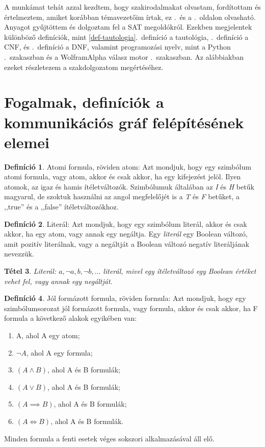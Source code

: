 \documentclass[
]{thesis-ekf}
\newtheorem{tetel}{Tétel}[chapter]
\theoremstyle{definition}
\newtheorem{definicio}[tetel]{Definíció}
\theoremstyle{remark}
\begin{document}
	A munkámat tehát azzal kezdtem, hogy szakirodalmakat olvastam, fordítottam és értelmeztem, amiket korábban témavezetőim írtak, ez \az{\pageref{ssec-szakirodalom}}.~és a \az{\pageref{sec-szakirodalom-forditas}}.~oldalon olvasható.
	Anyagot gyűjtöttem és dolgoztam fel a \textsc{SAT} megoldókról.
	Ezekben megjelentek különböző definíciók, mint \ref{def-tautologia}.~definíció a tautológia, \az{\ref{def-cnf}}.~definíció a \textsc{CNF}, és \az{\ref{def-dnf}}.~definíció a \textsc{DNF}, valamint programozási nyelv, mint a Python \az{\ref{kif-python-programnyelv}}.~szakaszban és a WolframAlpha válasz motor \az{\ref{kif-wolframalpha-hasznalata}}.~szakaszban. Az alábbiakban ezeket részletezem a szakdolgozatom megértéséhez.
		
	\section{Fogalmak, definíciók a kommunikációs gráf felépítésének elemei}\label{sec-alap-fogalmak}
	
	\begin{definicio}
		Atomi formula, röviden atom: Azt mondjuk, hogy egy szimbólum atomi formula, vagy atom, akkor és csak akkor, ha egy kifejezést jelöl. Ilyen atomok, az igaz és hamis ítéletváltozók. Szimbólumuk általában az \emph{I} és \emph{H} betűk magyarul, de szoktuk használni az angol megfelelőjét is a \emph{T} és \emph{F} betűket, a ,,true'' és a ,,false'' ítéletváltozókhoz.
	\end{definicio}

	\begin{definicio}
		Literál: Azt mondjuk, hogy egy szimbólum literál, akkor és csak akkor, ha egy atom, vagy annak egy negáltja.
		Egy \emph{literál} egy Boolean változó, amit pozitív literálnak, vagy a negáltját a Boolean változó negatív literáljának nevezzük. 
	\end{definicio}

	\begin{tetel}
		Literál: $ a,\neg a,b,\neg b,\dots $ literál, mivel egy ítéletváltozó egy Boolean értéket vehet fel, vagy annak egy negáltját.
	\end{tetel}

	\begin{definicio}		
		Jól formázott formula, röviden formula: Azt mondjuk, hogy egy szimbólumsorozat jól formázott formula, vagy formula, akkor és csak akkor, ha F formula a következő alakok egyikében van:
		\begin{enumerate}[label=\textit{(\alph*)}]
			\item A, ahol A egy atom;
			\item $ \neg A $, ahol A egy formula;
			\item $ (A \wedge B) $, ahol A és B formulák;
			\item $ (A \vee B) $, ahol A és B formulák;
			\item $ (A \implies B) $, ahol A és B formulák;
			\item $ (A \Leftrightarrow B) $, ahol A és B formulák.
		\end{enumerate}
		Minden formula a fenti esetek véges sokszori alkalmazásával áll elő.
	\end{definicio}
\end{document}
